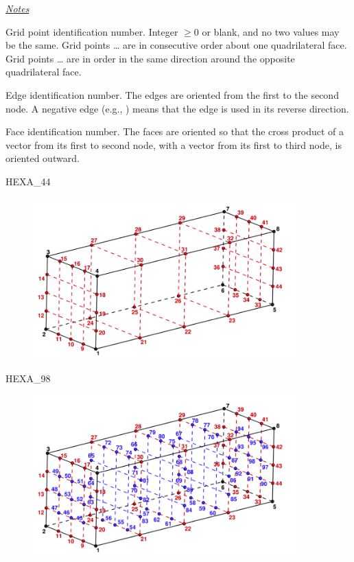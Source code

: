 {{{\medskip

\uline{\textit{Notes}}

\begin{Ventryi}{}
   \item [\fort{N1,\ldots,N64}]
         Grid point identification number.
         Integer $\ge 0$ or blank, and no two values may be the same.
         Grid points \ldots{} are in consecutive order about
         one quadrilateral face.
         Grid points \ldots{} are in order in the same
         direction around the opposite quadrilateral face.
   \item [\fort{E1,\ldots,E12}]
         Edge identification number.
         The edges are oriented from the first to the second node.
         A negative edge (e.g., ) means that the edge is used in
         its reverse direction.
   \item [\fort{F1,\ldots,F6}]
         Face identification number.
         The faces are oriented so that the cross product of a vector
         from its first to second node, with a vector from its first to
         third node, is oriented outward.
\end{Ventryi}

\newpage
{}

HEXA\_44
\begin{figure}[!htb]
   \includegraphics[width=4in]{conv.figs/TecplotFiles_Quartic_Element/All_Figures/Hexa_44}
\end{figure}

\bigskip

HEXA\_98
\begin{figure}[!htb]
   \includegraphics[width=4in]{conv.figs/TecplotFiles_Quartic_Element/All_Figures/Hexa_98}
\end{figure}

}}}
